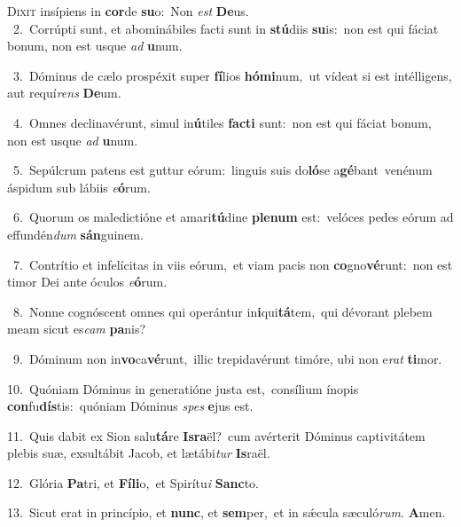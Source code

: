 \lettrine{\initial\textcolor{\initialcolor}{D}}{ixit} insípiens in \textbf{cor}\-de \textbf{su}\-o:~\star Non \textit{est} \textbf{De}\-us.\\
{\numbfont\textcolor{\numbcolor}{~2.}}~Corrúpti sunt, et abominábiles facti sunt in \textbf{stú}\-diis \textbf{su}\-is:~\star non est qui fáciat bonum, non est usque \textit{ad} \textbf{u}\-num.\par
{\numbfont\textcolor{\numbcolor}{~3.}}~Dóminus de cælo prospéxit super \textbf{fí}\-lios \textbf{hó}\-\textbf{mi}num,~\star ut vídeat si est intélligens, aut requí\textit{rens} \textbf{De}\-um.\par
{\numbfont\textcolor{\numbcolor}{~4.}}~Omnes declinavérunt, simul in\-\textbf{ú}\-tiles \textbf{fac}\-\textbf{ti} sunt:~\star non est qui fáciat bonum, non est usque \textit{ad} \textbf{u}\-num.\par
{\numbfont\textcolor{\numbcolor}{~5.}}~Sepúlcrum patens est guttur eórum:~\dagger linguis suis do\-\textbf{ló}\-se a\-\textbf{gé}\-bant~\star venénum áspidum sub lábiis \textit{e}\-\textbf{ó}rum.\par
{\numbfont\textcolor{\numbcolor}{~6.}}~Quorum os maledictióne et amari\-\textbf{tú}\-dine \textbf{ple}\-\textbf{num} est:~\star velóces pedes eórum ad effundén\textit{dum} \textbf{sán}\-guinem.\par
{\numbfont\textcolor{\numbcolor}{~7.}}~Contrítio et infelícitas in viis eórum,~\dagger et viam pacis non \textbf{co}\-gno\-\textbf{vé}\-runt:~\star non est timor Dei ante óculos \textit{e}\-\textbf{ó}rum.\par
{\numbfont\textcolor{\numbcolor}{~8.}}~Nonne cognóscent omnes qui operántur in\-\textbf{i}\-qui\-\textbf{tá}\-tem,~\star qui dévorant plebem meam sicut es\textit{cam} \textbf{pa}\-nis?\par
{\numbfont\textcolor{\numbcolor}{~9.}}~Dóminum non in\-\textbf{vo}\-ca\-\textbf{vé}\-runt,~\star illic trepidavérunt timóre, ubi non e\textit{rat} \textbf{ti}\-mor.\par
{\numbfont\textcolor{\numbcolor}{10.}}~Quóniam Dóminus in generatióne justa est,~\dagger consílium ínopis \textbf{con}\-fu\-\textbf{dís}\-tis:~\star quóniam Dóminus \textit{spes} \textbf{e}\-jus est.\par
{\numbfont\textcolor{\numbcolor}{11.}}~Quis dabit ex Sion salu\-\textbf{tá}\-re \textbf{Is}\-\textbf{ra}ël?~\star cum avérterit Dóminus captivitátem plebis suæ, exsultábit Jacob, et lætábi\textit{tur} \textbf{Is}\-raël.\par
{\numbfont\textcolor{\numbcolor}{12.}}~Glória \textbf{Pa}\-tri, et \textbf{Fí}\-\textbf{li}o,~\star et Spirítu\textit{i} \textbf{Sanc}\-to.\par
{\numbfont\textcolor{\numbcolor}{13.}}~Sicut erat in princípio, et \textbf{nunc}\-, et \textbf{sem}\-per,~\star et in sǽcula sæculó\-\textit{rum}\-. \textbf{A}\-men.\par
